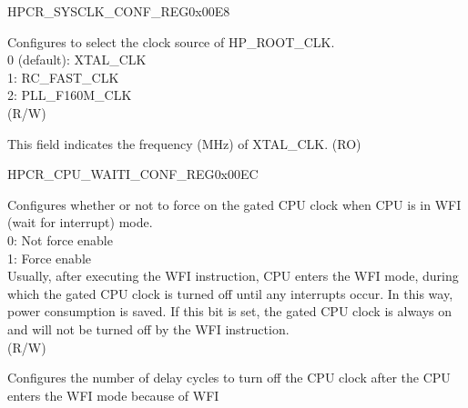 \begin{register}{H}{PCR\_SYSCLK\_CONF\_REG}{0x00E8}\label{regdesc:PCRSYSCLKCONFREG}
%
%
%
%
%
\regnewline%
\begin{regdesc}\begin{reglist}
\label{fielddesc:PCRSOCCLKSEL}\item [PCR\_SOC\_CLK\_SEL] Configures to select the clock source of HP\_ROOT\_CLK.\\
0 (default): XTAL\_CLK\\
1: RC\_FAST\_CLK\\
2: PLL\_F160M\_CLK\\ (R/W)
\label{fielddesc:PCRCLKXTALFREQ}\item [PCR\_CLK\_XTAL\_FREQ] This field indicates the frequency (MHz) of XTAL\_CLK. (RO)
\end{reglist}\end{regdesc}
\end{register}


\begin{register}{H}{PCR\_CPU\_WAITI\_CONF\_REG}{0x00EC}\label{regdesc:PCRCPUWAITICONFREG}
%
%
%
%
\regnewline%
\begin{regdesc}\begin{reglist}
\label{fielddesc:PCRCPUWAITMODEFORCEON}\item [PCR\_CPU\_WAIT\_MODE\_FORCE\_ON] Configures whether or not to force on the gated CPU clock when CPU is in WFI (wait for interrupt) mode.\\
0: Not force enable\\
1: Force enable\\
Usually, after executing the WFI instruction, CPU enters the WFI mode, during which the gated CPU clock is turned off until any interrupts occur. In this way, power consumption is saved. If this bit is set, the gated CPU clock is always on and will not be turned off by the WFI instruction.\\(R/W)
\label{fielddesc:PCRCPUWAITIDELAYNUM}\item [PCR\_CPU\_WAITI\_DELAY\_NUM] Configures the number of delay cycles to turn off the CPU clock after the CPU enters the WFI mode because of WFI
\end{reglist}\end{regdesc}
\end{register}


